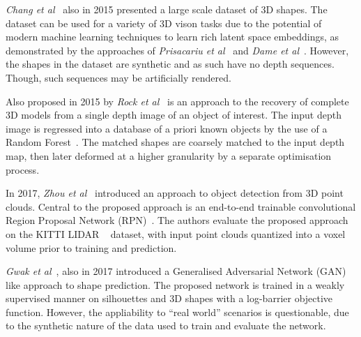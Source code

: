 \textit{Chang et al}~\cite{Chang2015} also in 2015 presented a large scale dataset of 3D shapes. The 
dataset can be used for a variety of 3D vison tasks due to the potential of modern machine learning 
techniques to learn rich latent space embeddings, as demonstrated by the approaches of 
\textit{Prisacariu et al}~\cite{Prisacariu2011} and \textit{Dame et al}~\cite{Dame2013}. However, the 
shapes in the dataset are synthetic and as such have no depth sequences. Though, such sequences may be 
artificially rendered.

Also proposed in 2015 by \textit{Rock et al}~\cite{Rock2015} is an approach to the recovery of complete 
3D models from a single depth image of an object of interest. The input depth image is regressed into a 
database of a priori known objects by the use of a Random Forest~\cite{Ho1995}. The matched shapes are 
coarsely matched to the input depth map, then later deformed at a higher granularity by a separate 
optimisation process.

In 2017, \textit{Zhou et al}~\cite{Zhou2017_2} introduced an approach to object detection from 3D point 
clouds. Central to the proposed approach is an end-to-end trainable convolutional Region Proposal 
Network (RPN)~\cite{Girshick2015_2}. The authors evaluate the proposed approach on the KITTI LIDAR 
~\cite{Geiger2013} dataset, with input point clouds quantized into a voxel volume prior to training 
and prediction.

\textit{Gwak et al}~\cite{Gwak2017}, also in 2017 introduced a Generalised Adversarial Network 
(GAN)~\cite{Goodfellow2014} like approach to shape prediction. The proposed network is trained in a 
weakly supervised manner on silhouettes and 3D shapes with a log-barrier objective function. 
However, the appliability to ``real world'' scenarios is questionable, due to the synthetic nature of 
the data used to train and evaluate the network.
